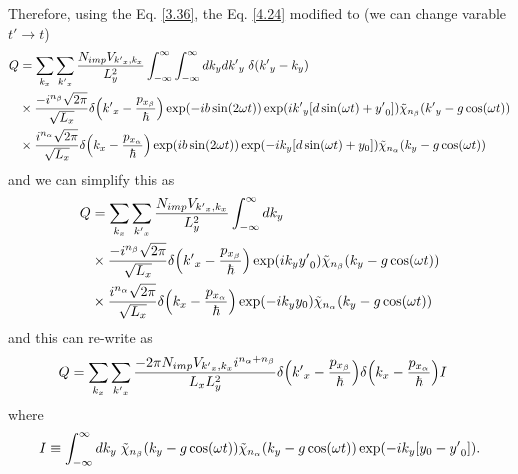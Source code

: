 \noindent
Therefore, using the Eq. \eqref{3.36}, the Eq. \eqref{4.24} modified to (we can change varable $t' \rightarrow t$)
\begin{equation} \label{4.34}
  \begin{aligned}
    Q & =
    \sum_{k_x}\sum_{{k'}_x}
    \frac{N_{imp} V_{{k'}_x,k_x}}{L_y^2}
    \int_{-\infty}^{\infty} \int_{-\infty}^{\infty} dk_y d{k'}_y \;
    \delta({k'}_y - k_y)
    \\
    & \times
    \frac{-i^{n_{\beta}}\sqrt{2\pi}}{\sqrt{L_x}}
    \delta\qty({k'}_x -\frac{p_{x_{\beta}}}{\hbar})
    \exp(
      -ib\sin(2\omega t)
    )
    \exp(
      i{k'}_y  \qty[d\sin(\omega t) + {y'}_0]
    )
    \tilde{\chi}_{n_{\beta}}\qty({k'}_y -g\cos(\omega t))
    \\
    & \times
    \frac{i^{n_{\alpha}}\sqrt{2\pi}}{\sqrt{L_x}}
    \delta\qty(k_x -\frac{p_{x_{\alpha}}}{\hbar})
    \exp(
      ib\sin(2\omega t)
    )
    \exp(
      -ik_y  \qty[d\sin(\omega t) + y_0]
    )
    \tilde{\chi}_{n_{\alpha}}\qty(k_y -g\cos(\omega t))
  \end{aligned}
\end{equation}
and we can simplify this as
\begin{equation} \label{4.35}
  \begin{aligned}
    Q & =
    \sum_{k_x}\sum_{{k'}_x}
    \frac{N_{imp} V_{{k'}_x,k_x}}{L_y^2}
    \int_{-\infty}^{\infty} dk_y \;
    \\
    & \times
    \frac{-i^{n_{\beta}}\sqrt{2\pi}}{\sqrt{L_x}}
    \delta\qty({k'}_x -\frac{p_{x_{\beta}}}{\hbar})
    \exp(
      i{k}_y {y'}_0
    )
    \tilde{\chi}_{n_{\beta}}\qty({k}_y -g\cos(\omega t))
    \\
    & \times
    \frac{i^{n_{\alpha}}\sqrt{2\pi}}{\sqrt{L_x}}
    \delta\qty(k_x -\frac{p_{x_{\alpha}}}{\hbar})
    \exp(
      -ik_y y_0
    )
    \tilde{\chi}_{n_{\alpha}}\qty(k_y -g\cos(\omega t))
  \end{aligned}
\end{equation}
and this can re-write as
\begin{equation} \label{4.36}
  \begin{aligned}
    Q =
    \sum_{k_x}\sum_{{k'}_x}
    \frac{-2\pi N_{imp} V_{{k'}_x,k_x} i^{n_{\alpha} + n_{\beta}}}{L_x L_y^2} &
    \delta\qty({k'}_x -\frac{p_{x_{\beta}}}{\hbar})
    \delta\qty(k_x -\frac{p_{x_{\alpha}}}{\hbar})
    I
  \end{aligned}
\end{equation}
where
\begin{equation} \label{4.37}
  \begin{aligned}
    I \equiv
    \int_{-\infty}^{\infty} dk_y \;
    \tilde{\chi}_{n_{\beta}}\qty(k_y -g\cos(\omega t))
    \tilde{\chi}_{n_{\alpha}}\qty(k_y -g\cos(\omega t))
    \exp(
      -ik_y  \qty[y_0 - {y'}_0  ]
    ).
  \end{aligned}
\end{equation}

